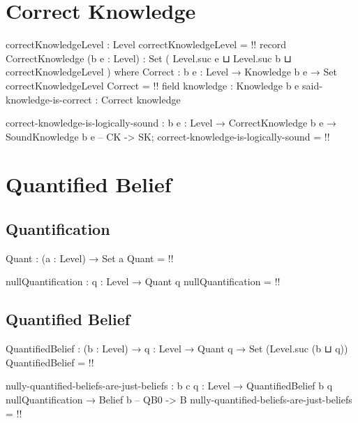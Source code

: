 \documentclass{article}
\begin{document}
\section{Correct Knowledge}

\begin{code}
correctKnowledgeLevel : Level
correctKnowledgeLevel = {!!}
record CorrectKnowledge (b e : Level) :
                        Set ( Level.suc e
                            ⊔ Level.suc b
                            ⊔ correctKnowledgeLevel
                            ) where
  Correct : {b e : Level} → Knowledge b e → Set correctKnowledgeLevel
  Correct = {!!}
  field
    knowledge : Knowledge b e
    said-knowledge-is-correct : Correct knowledge
\end{code}

\begin{code}
correct-knowledge-is-logically-sound :
  {b e : Level} → CorrectKnowledge b e → SoundKnowledge b e -- CK -> SK;
correct-knowledge-is-logically-sound = {!!}
\end{code}

\section{Quantified Belief}

\subsection{Quantification}

\begin{code}
Quant : (a : Level) → Set a
Quant = {!!}
\end{code}

\begin{code}
nullQuantification : {q : Level} → Quant q
nullQuantification = {!!}
\end{code}

\subsection{Quantified Belief}

\begin{code}
QuantifiedBelief : (b : Level) → {q : Level} → Quant q → Set (Level.suc (b ⊔ q))
QuantifiedBelief = {!!}
\end{code}

\begin{code}
nully-quantified-beliefs-are-just-beliefs :
  {b c q : Level} → QuantifiedBelief b {q} nullQuantification → Belief b -- QB0 -> B
nully-quantified-beliefs-are-just-beliefs = {!!}
\end{code}
\end{document}
